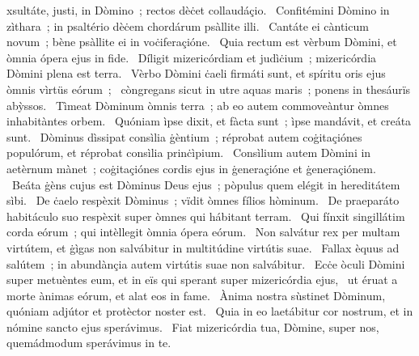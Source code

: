{ }
{%
xsultáte, justi, in Dòmino~; rectos dèċet collaudáçio. 
~Confitémini Dòmino in zìthara~; in psaltério dèċem chordárum psàllite illi. 
~Cantáte ei cànticum novum~; bène psàllite ei in voċiferaçióne. 
~Quia rectum est vèrbum Dòmini, et òmnia ópera ejus in fide. 
~Díligit mizericórdiam et judìċium~; mizericórdia Dòmini plena est terra. 
~Vèrbo Dòmini ċaeli firmáti sunt, et spíritu oris ejus òmnis vìrtüs eórum~; 
~còngregans sicut in utre aquas maris~; ponens in thesáurïs abỳssos. 
~Tìmeat Dòminum òmnis terra~; ab eo autem commoveàntur òmnes inhabitàntes orbem. 
~Quóniam ìpse dixit, et fàcta sunt~; ìpse mandávit, et creáta sunt. 
~Dòminus dìssipat consìlia ġèntium~; réprobat autem coġitaçiónes populórum, et réprobat consìlia prinċìpium. 
~Consìlium autem Dòmini in aetèrnum mànet~; coġitaçiónes cordis ejus in ġeneraçióne et ġeneraçiónem. 
~Beáta ġèns cujus est Dòminus Deus ejus~; pòpulus quem elégit in hereditátem sìbi. 
~De ċaelo respèxit Dòminus~; vïdit òmnes fílios hòminum. 
~De praeparáto habitáculo suo respèxit super òmnes qui hábitant terram. 
~Qui fínxit singillátim corda eórum~; qui intèllegit òmnia ópera eórum. 
~Non salvátur rex per multam virtútem, et ġìgas non salvábitur in multitúdine virtútis suae. 
~Fallax èquus ad salútem~; in abundànçia autem virtútis suae non salvábitur. 
~Ecċe òculi Dòmini super metuèntes eum, et in eïs qui sperant super mizericórdia ejus, 
~ut éruat a morte ànimas eórum, et alat eos in fame. 
~Ànima nostra sùstinet Dòminum, quóniam adjútor et protèctor noster est. 
~Quia in eo laetábitur cor nostrum, et in nómine sancto ejus sperávimus. 
~Fiat mizericórdia tua, Dòmine, super nos, quemádmodum sperávimus in te. 
}
